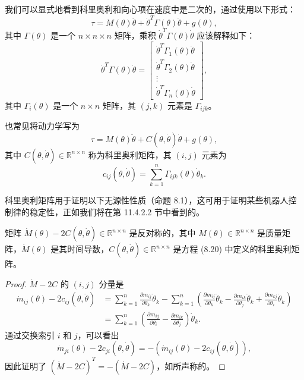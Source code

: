 \documentclass[12pt,a4paper]{article}
\begin{document}
我们可以显式地看到科里奥利和向心项在速度中是二次的，通过使用以下形式：
\begin{equation}
\tau = M(\theta)\ddot{\theta} + \dot{\theta}^T \Gamma(\theta)\dot{\theta} + g(\theta), \label{eq:8.18}
\end{equation}
其中 $\Gamma(\theta)$ 是一个 $n \times n \times n$ 矩阵，乘积 $\dot{\theta}^T \Gamma(\theta)\dot{\theta}$ 应该解释如下：
\begin{equation}
\dot{\theta}^T \Gamma(\theta)\dot{\theta} = \begin{bmatrix} \dot{\theta}^T \Gamma_1(\theta)\dot{\theta} \\ \dot{\theta}^T \Gamma_2(\theta)\dot{\theta} \\ \vdots \\ \dot{\theta}^T \Gamma_n(\theta)\dot{\theta} \end{bmatrix},
\end{equation}
其中 $\Gamma_i(\theta)$ 是一个 $n \times n$ 矩阵，其 $(j, k)$ 元素是 $\Gamma_{ijk}$。

也常见将动力学写为
\begin{equation}
\tau = M(\theta)\ddot{\theta} + C(\theta, \dot{\theta})\dot{\theta} + g(\theta), \label{eq:8.19}
\end{equation}
其中 $C(\theta, \dot{\theta}) \in \mathbb{R}^{n \times n}$ 称为科里奥利矩阵，其 $(i, j)$ 元素为
\begin{equation}
c_{ij}(\theta, \dot{\theta}) = \sum_{k=1}^{n} \Gamma_{ijk}(\theta)\dot{\theta}_k. \label{eq:8.20}
\end{equation}

科里奥利矩阵用于证明以下无源性性质（命题 8.1），这可用于证明某些机器人控制律的稳定性，正如我们将在第 11.4.2.2 节中看到的。

\begin{proposition}[命题 8.1]
矩阵 $\dot{M}(\theta) - 2C(\theta, \dot{\theta}) \in \mathbb{R}^{n \times n}$ 是反对称的，其中 $M(\theta) \in \mathbb{R}^{n \times n}$ 是质量矩阵，$\dot{M}(\theta)$ 是其时间导数，$C(\theta, \dot{\theta}) \in \mathbb{R}^{n \times n}$ 是方程 (8.20) 中定义的科里奥利矩阵。
\end{proposition}

\begin{proof}
$\dot{M} - 2C$ 的 $(i, j)$ 分量是
\begin{align}
\dot{m}_{ij}(\theta) - 2c_{ij}(\theta, \dot{\theta}) &= \sum_{k=1}^{n} \frac{\partial m_{ij}}{\partial \theta_k}\dot{\theta}_k - \sum_{k=1}^{n}\left(\frac{\partial m_{ij}}{\partial \theta_k}\dot{\theta}_k - \frac{\partial m_{ik}}{\partial \theta_j}\dot{\theta}_k + \frac{\partial m_{kj}}{\partial \theta_i}\dot{\theta}_k\right) \nonumber \\
&= \sum_{k=1}^{n}\left(\frac{\partial m_{kj}}{\partial \theta_i} - \frac{\partial m_{ik}}{\partial \theta_j}\right)\dot{\theta}_k.
\end{align}
通过交换索引 $i$ 和 $j$，可以看出
\begin{equation}
\dot{m}_{ji}(\theta) - 2c_{ji}(\theta, \dot{\theta}) = -(\dot{m}_{ij}(\theta) - 2c_{ij}(\theta, \dot{\theta})),
\end{equation}
因此证明了 $(\dot{M} - 2C)^T = -(\dot{M} - 2C)$，如所声称的。
\end{proof}
\end{document}
